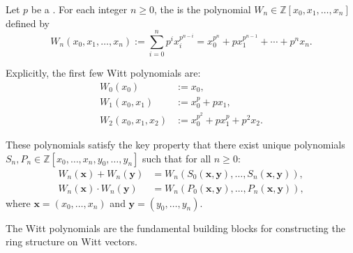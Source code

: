 \begin{definition}\label{definition:witt_polynomial_with_respect_to_a_prime_number}
Let $p$ be a . For each integer $n \geq 0$, the  is the polynomial $W_n \in \mathbb{Z}[x_0, x_1, \dots, x_n]$ defined by
$$
    W_n(x_0, x_1, \dots, x_n) := \sum_{i=0}^n p^i x_i^{p^{n-i}} = x_0^{p^n} + p x_1^{p^{n-1}} + \cdots + p^n x_n.
$$

Explicitly, the first few Witt polynomials are:
\begin{align*}
    W_0(x_0) &:= x_0, \\
    W_1(x_0, x_1) &:= x_0^p + p x_1, \\
    W_2(x_0, x_1, x_2) &:= x_0^{p^2} + p x_1^p + p^2 x_2.
\end{align*}

These polynomials satisfy the key property that there exist unique polynomials $S_n, P_n \in \mathbb{Z}[x_0, \dots, x_n, y_0, \dots, y_n]$ such that for all $n \geq 0$:
\begin{align*}
    W_n(\mathbf{x}) + W_n(\mathbf{y}) &= W_n(S_0(\mathbf{x}, \mathbf{y}), \dots, S_n(\mathbf{x}, \mathbf{y})), \\
    W_n(\mathbf{x}) \cdot W_n(\mathbf{y}) &= W_n(P_0(\mathbf{x}, \mathbf{y}), \dots, P_n(\mathbf{x}, \mathbf{y})),
\end{align*}
where $\mathbf{x} = (x_0, \dots, x_n)$ and $\mathbf{y} = (y_0, \dots, y_n)$.

The Witt polynomials are the fundamental building blocks for constructing the ring structure on Witt vectors.
\end{definition}
